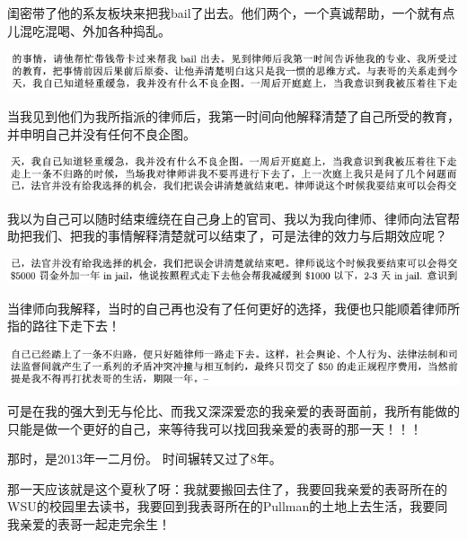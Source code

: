 \documentclass[9pt, b5paper]{article}
\begin{document}
闺密带了他的系友板块来把我bail了出去。他们两个，一个真诚帮助，一个就有点儿混吃混喝、外加各种捣乱。

\begin{center}
\includegraphics[width=.9\linewidth]{./pic/backups_plans_20210506_085817.png}
\end{center}

当我见到他们为我所指派的律师后，我第一时间向他解释清楚了自己所受的教育，并申明自己并没有任何不良企图。

\begin{center}
\includegraphics[width=.9\linewidth]{./pic/backups_plans_20210506_085853.png}
\end{center}

我以为自己可以随时结束缠绕在自己身上的官司、我以为我向律师、律师向法官帮助把我们、把我的事情解释清楚就可以结束了，可是法律的效力与后期效应呢？

\begin{center}
\includegraphics[width=.9\linewidth]{./pic/backups_plans_20210506_085944.png}
\end{center}

当律师向我解释，当时的自己再也没有了任何更好的选择，我便也只能顺着律师所指的路往下走下去！ 

\begin{center}
\includegraphics[width=.9\linewidth]{./pic/backups_plans_20210506_090008.png}
\end{center}

可是在我的强大到无与伦比、而我又深深爱恋的我亲爱的表哥面前，我所有能做的只能是做一个更好的自己，来等待我可以找回我亲爱的表哥的那一天！！！

那时，是2013年一二月份。 时间辗转又过了8年。 

那一天应该就是这个夏秋了呀：我就要搬回去住了，我要回我亲爱的表哥所在的WSU的校园里去读书，我要回到我表哥所在的Pullman的土地上去生活，我要同我亲爱的表哥一起走完余生！
\end{document}
